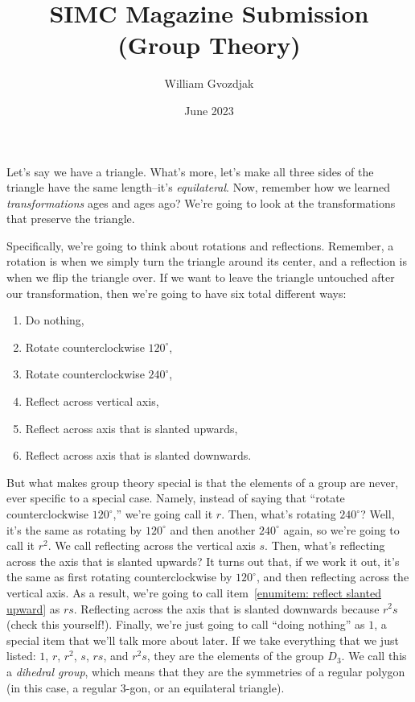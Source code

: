 \documentclass{article}
\title{SIMC Magazine Submission (Group Theory)}
\author{William Gvozdjak}
\date{June 2023}
\begin{document}
\maketitle

Let's say we have a triangle. What's more, let's make all three sides of the triangle have the same length--it's \emph{equilateral}. Now, remember how we learned \emph{transformations} ages and ages ago? We're going to look at the transformations that preserve the triangle.

Specifically, we're going to think about rotations and reflections. Remember, a rotation is when we simply turn the triangle around its center, and a reflection is when we flip the triangle over. If we want to leave the triangle untouched after our transformation, then we're going to have six total different ways:
\begin{enumerate}
    \item Do nothing,
    \item Rotate counterclockwise $120^\circ$,
    \item Rotate counterclockwise $240^\circ$,
    \item Reflect across vertical axis,
    \item Reflect across axis that is slanted upwards\label{enumitem: reflect slanted upward},
    \item Reflect across axis that is slanted downwards.
\end{enumerate}

But what makes group theory special is that the elements of a group are never, ever specific to a special case. Namely, instead of saying that ``rotate counterclockwise $120^\circ$,'' we're going call it $r$. Then, what's rotating $240^\circ$? Well, it's the same as rotating by $120^\circ$ and then another $240^\circ$ again, so we're going to call it $r^2$. We call reflecting across the vertical axis $s$. Then, what's reflecting across the axis that is slanted upwards? It turns out that, if we work it out, it's the same as first rotating counterclockwise by $120^\circ$, and then reflecting across the vertical axis. As a result, we're going to call item~\ref{enumitem: reflect slanted upward} as $rs$. Reflecting across the axis that is slanted downwards because $r^2s$ (check this yourself!). Finally, we're just going to call ``doing nothing'' as $1$, a special item that we'll talk more about later. If we take everything that we just listed: $1$, $r$, $r^2$, $s$, $rs$, and $r^2s$, they are the elements of the group $D_3$. We call this a \emph{dihedral group}, which means that they are the symmetries of a regular polygon (in this case, a regular $3$-gon, or an equilateral triangle).
\end{document}
